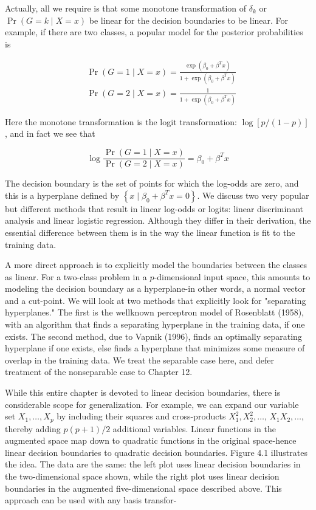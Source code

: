 \documentclass[10pt]{article}
\begin{document}
Actually, all we require is that some monotone transformation of $\delta_{k}$ or $\operatorname{Pr}(G=k \mid X=x)$ be linear for the decision boundaries to be linear. For example, if there are two classes, a popular model for the posterior probabilities is


\begin{align*}
& \operatorname{Pr}(G=1 \mid X=x)=\frac{\exp \left(\beta_{0}+\beta^{T} x\right)}{1+\exp \left(\beta_{0}+\beta^{T} x\right)}  \tag{4.1}\\
& \operatorname{Pr}(G=2 \mid X=x)=\frac{1}{1+\exp \left(\beta_{0}+\beta^{T} x\right)}
\end{align*}


Here the monotone transformation is the logit transformation: $\log [p /(1-p)]$, and in fact we see that


\begin{equation*}
\log \frac{\operatorname{Pr}(G=1 \mid X=x)}{\operatorname{Pr}(G=2 \mid X=x)}=\beta_{0}+\beta^{T} x \tag{4.2}
\end{equation*}


The decision boundary is the set of points for which the log-odds are zero, and this is a hyperplane defined by $\left\{x \mid \beta_{0}+\beta^{T} x=0\right\}$. We discuss two very popular but different methods that result in linear log-odds or logits: linear discriminant analysis and linear logistic regression. Although they differ in their derivation, the essential difference between them is in the way the linear function is fit to the training data.

A more direct approach is to explicitly model the boundaries between the classes as linear. For a two-class problem in a $p$-dimensional input space, this amounts to modeling the decision boundary as a hyperplane-in other words, a normal vector and a cut-point. We will look at two methods that explicitly look for "separating hyperplanes." The first is the wellknown perceptron model of Rosenblatt (1958), with an algorithm that finds a separating hyperplane in the training data, if one exists. The second method, due to Vapnik (1996), finds an optimally separating hyperplane if one exists, else finds a hyperplane that minimizes some measure of overlap in the training data. We treat the separable case here, and defer treatment of the nonseparable case to Chapter 12.

While this entire chapter is devoted to linear decision boundaries, there is considerable scope for generalization. For example, we can expand our variable set $X_{1}, \ldots, X_{p}$ by including their squares and cross-products $X_{1}^{2}, X_{2}^{2}, \ldots$, $X_{1} X_{2}, \ldots$, thereby adding $p(p+1) / 2$ additional variables. Linear functions in the augmented space map down to quadratic functions in the original space-hence linear decision boundaries to quadratic decision boundaries. Figure 4.1 illustrates the idea. The data are the same: the left plot uses linear decision boundaries in the two-dimensional space shown, while the right plot uses linear decision boundaries in the augmented five-dimensional space described above. This approach can be used with any basis transfor-
\end{document}
